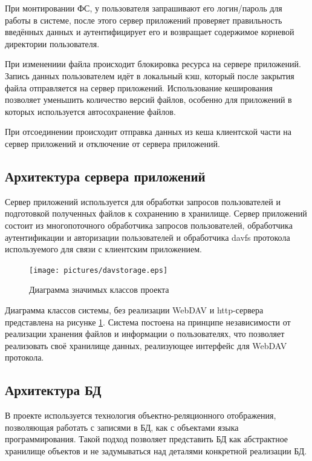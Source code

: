 \documentclass[utf8,usehyperref,12pt]{G7-32}
\begin{document}
При монтировании ФС, у пользователя запрашивают его логин/пароль для работы в системе, после этого сервер приложений проверяет правильность введённых данных и аутентифицирует его и возвращает содержимое корневой директории пользователя.

При изменениии файла происходит блокировка ресурса на сервере приложений. Запись данных пользователем идёт в локальный кэш, который после закрытия файла отправляется на сервер приложений. Использование кеширования позволяет уменьшить количество версий файлов, особенно для приложений в которых используется автосохранение файлов.

При отсоединении происходит отправка данных из кеша клиентской части на сервер приложений и отключение от сервера приложений.

\subsection{Архитектура сервера приложений}

Сервер приложений используется для обработки запросов пользователей и подготовкой полученных файлов к сохранению в хранилище. Сервер приложений состоит из многопоточного обработчика запросов пользователей, обработчика аутентификации и авторизации пользователей и обработчика davfs протокола используемого для связи с клиентским приложением.

\begin{figure}[ht]
   \centering%
   \texttt{[image: pictures/davstorage.eps]}
   \caption{Диаграмма значимых классов проекта}\label{fig:davstorage}
 \end{figure}
 
 Диаграмма классов системы, без реализации WebDAV и http-сервера представлена на рисунке \ref{fig:davstorage}. Система постоена на принципе независимости от реализации хранения файлов и информации о пользователях, что позволяет реализовать своё хранилище данных, реализующее интерфейс для WebDAV протокола.
 

\subsection{Архитектура БД}

В проекте используется технология объектно-реляционного отображения, позволяющая работать с записями в БД, как с объектами языка программирования. Такой подход позволяет представить БД как абстрактное хранилище объектов и не задумываться над деталями конкретной реализации БД.
\end{document}
